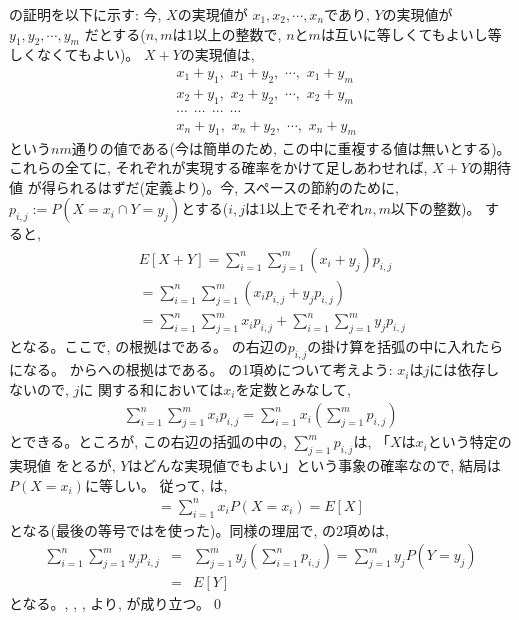 の証明を以下に示す: 今, $X$の実現値が
$x_1, x_2, \cdots, x_n$であり, $Y$の実現値が$y_1, y_2, \cdots, y_m$
だとする($n, m$は1以上の整数で, $n$と$m$は互いに等しくてもよいし等しくなくてもよい)。
$X+Y$の実現値は, 
\begin{eqnarray*}
&x_1+y_1,\,\, x_1+y_2,\,\, \cdots,\,\, x_1+y_m\\
&x_2+y_1,\,\, x_2+y_2,\,\, \cdots,\,\, x_2+y_m\\
&\cdots\,\,\,\cdots\,\,\,\cdots\,\,\,\cdots\\
&x_n+y_1,\,\, x_n+y_2,\,\, \cdots,\,\, x_n+y_m
\end{eqnarray*}
という$nm$通りの値である(今は簡単のため, この中に重複する値は無いとする)。
これらの全てに, それぞれが実現する確率をかけて足しあわせれば, $X+Y$の期待値
が得られるはずだ(定義より)。今, スペースの節約のために, 
$p_{i,j}:=P(X=x_i\cap Y=y_j)$とする($i, j$は1以上でそれぞれ$n, m$以下の整数)。
すると, 
\begin{eqnarray}
&&E[X+Y]=\sum_{i=1}^{n}\sum_{j=1}^{m}(x_i+y_j)p_{i,j}\label{eq:EXplusY08}\\
&&=\sum_{i=1}^{n}\sum_{j=1}^{m}(x_ip_{i, j}+y_jp_{i, j})\label{eq:EXplusY09}\\
&&=\sum_{i=1}^{n}\sum_{j=1}^{m}x_ip_{i, j}+\sum_{i=1}^{n}\sum_{j=1}^{m}y_jp_{i,j}\label{eq:EXplusY10}
\end{eqnarray}
となる。ここで, の根拠はである。
の右辺の$p_{i,j}$の掛け算を括弧の中に入れたらになる。
からへの根拠はである。
の1項めについて考えよう: $x_i$は$j$には依存しないので, $j$に
関する和においては$x_i$を定数とみなして, 
\begin{eqnarray}
\sum_{i=1}^{n}\sum_{j=1}^{m}x_ip_{i, j}=\sum_{i=1}^{n}x_i(\sum_{j=1}^{m}p_{i, j})\label{eq:EXplusY11}
\end{eqnarray}
とできる。ところが, この右辺の括弧の中の, $\sum_{j=1}^{m}p_{i, j}$は, 「$X$は$x_i$という特定の実現値
をとるが, $Y$はどんな実現値でもよい」という事象の確率なので, 結局は$P(X=x_i)$に等しい。
従って, は, 
\begin{eqnarray}
=\sum_{i=1}^{n}x_iP(X=x_i)=E[X]\label{eq:EXplusY12}
\end{eqnarray}
となる(最後の等号ではを使った)。同様の理屈で, の2項めは, 
\begin{eqnarray}
\sum_{i=1}^{n}\sum_{j=1}^{m}y_jp_{i, j}&=&\sum_{j=1}^{m}y_j(\sum_{i=1}^{n}p_{i, j})=\sum_{j=1}^{m}y_jP(Y=y_j)\nonumber\\
&=&E[Y]\label{eq:EXplusY13}
\end{eqnarray}
となる。, , , より, 
が成り立つ。\qed
\mv


